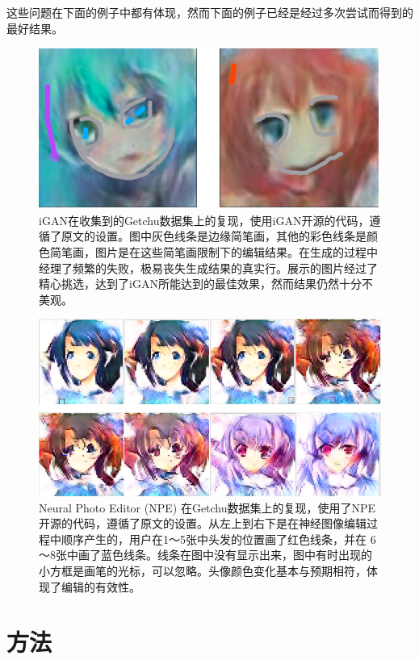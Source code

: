 \documentclass[a4paper,12pt,UTF8]{ctexart}
\newcommand{\kai}{\CJKfamily{zhkai}}	%
\begin{document}
这些问题在下面的例子中都有体现，然而下面的例子已经是经过多次尝试而得到的最好结果。

\begin{figure}[H]
  \centering
  \includegraphics[width=0.9\linewidth]{figs/baseline1.PNG}
  \caption{\kai iGAN在收集到的Getchu数据集上的复现，使用iGAN开源的代码，遵循了原文的设置。图中灰色线条是边缘简笔画，其他的彩色线条是颜色简笔画，图片是在这些简笔画限制下的编辑结果。在生成的过程中经理了频繁的失败，极易丧失生成结果的真实行。展示的图片经过了精心挑选，达到了iGAN所能达到的最佳效果，然而结果仍然十分不美观。}
  \label{fig:baseline1}
\end{figure}

\begin{figure}[H]
  \centering
  \includegraphics[width=0.9\linewidth]{figs/baseline2.PNG}
  \caption{\kai Neural Photo Editor (NPE) 在Getchu数据集上的复现，使用了NPE开源的代码，遵循了原文的设置。从左上到右下是在神经图像编辑过程中顺序产生的，用户在1～5张中头发的位置画了红色线条，并在 6～8张中画了蓝色线条。线条在图中没有显示出来，图中有时出现的小方框是画笔的光标，可以忽略。头像颜色变化基本与预期相符，体现了编辑的有效性。}
  \label{fig:baseline2}
\end{figure}

\section{方法}
\end{document}
